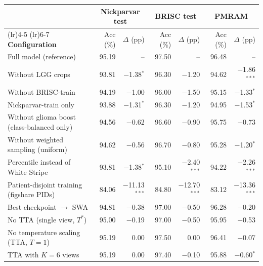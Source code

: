\begin{tabular}{>{\raggedright\arraybackslash}p{3.4cm} r r r r r r }
\toprule
 & \multicolumn{2}{c}{\textbf{Nickparvar test}} & \multicolumn{2}{c}{\textbf{BRISC test}} & \multicolumn{2}{c}{\textbf{PMRAM}} \\
\cmidrule(lr){2-3} \cmidrule(lr){4-5} \cmidrule(lr){6-7}
\textbf{Configuration} & Acc (\%) & $\Delta$ (pp) & Acc (\%) & $\Delta$ (pp) & Acc (\%) & $\Delta$ (pp) \\
\midrule
Full model (reference) & 95.19 & -- & 97.50 & -- & 96.48 & -- \\
\midrule
Without LGG crops & 93.81 & $-$1.38$^{*}$ & 96.30 & $-$1.20 & 94.62 & $-$1.86$^{***}$ \\
Without BRISC-train & 94.19 & $-$1.00 & 96.00 & $-$1.50 & 95.15 & $-$1.33$^{*}$ \\
Nickparvar-train only & 93.88 & $-$1.31$^{*}$ & 96.30 & $-$1.20 & 94.95 & $-$1.53$^{*}$ \\
Without glioma boost (class-balanced only) & 94.56 & $-$0.62 & 96.60 & $-$0.90 & 95.75 & $-$0.73 \\
Without weighted sampling (uniform) & 94.62 & $-$0.56 & 96.70 & $-$0.80 & 95.28 & $-$1.20$^{*}$ \\
Percentile instead of White Stripe & 93.81 & $-$1.38$^{*}$ & 95.10 & $-$2.40$^{***}$ & 94.22 & $-$2.26$^{***}$ \\
Patient-disjoint training (figshare PIDs) & 84.06 & $-$11.13$^{***}$ & 84.80 & $-$12.70$^{***}$ & 83.12 & $-$13.36$^{***}$ \\
\midrule
Best checkpoint $\rightarrow$ SWA & 94.81 & $-$0.38 & 97.00 & $-$0.50 & 96.28 & $-$0.20 \\
No TTA (single view, $T^{*}$) & 95.00 & $-$0.19 & 97.00 & $-$0.50 & 95.95 & $-$0.53 \\
No temperature scaling (TTA, $T=1$) & 95.19 & 0.00 & 97.50 & 0.00 & 96.41 & $-$0.07 \\
TTA with $K{=}6$ views & 95.19 & 0.00 & 97.40 & $-$0.10 & 95.88 & $-$0.60$^{*}$ \\
\bottomrule
\end{tabular}
